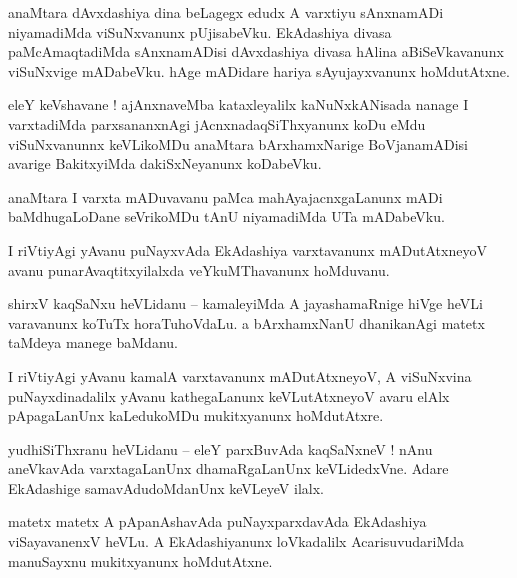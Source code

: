 \documentclass{article}
\begin{document}
\begin{mn}%
anaMtara dAvxdashiya dina beLagegx edudx A varxtiyu sAnxnamADi niyamadiMda viSuNxvanunx 
pUjisabeVku. EkAdashiya divasa paMcAmaqtadiMda sAnxnamADisi dAvxdashiya divasa hAlina 
aBiSeVkavanunx viSuNxvige mADabeVku. hAge mADidare hariya sAyujayxvanunx hoMdutAtxne.
\end{mn}

\begin{mn}%
eleY keVshavane ! ajAnxnaveMba kataxleyalilx kaNuNxkANisada nanage I varxtadiMda parxsananxnAgi 
jAcnxnadaqSiThxyanunx koDu eMdu viSuNxvanunnx keVLikoMDu anaMtara bArxhamxNarige BoVjanamADisi 
avarige BakitxyiMda dakiSxNeyanunx koDabeVku.
\end{mn}

\begin{mn}%
anaMtara I varxta mADuvavanu paMca mahAyajacnxgaLanunx mADi baMdhugaLoDane seVrikoMDu tAnU 
niyamadiMda UTa mADabeVku.
\end{mn}

\begin{mn}%
I riVtiyAgi yAvanu puNayxvAda EkAdashiya varxtavanunx mADutAtxneyoV avanu punarAvaqtitxyilalxda 
veYkuMThavanunx hoMduvanu.
\end{mn}

\begin{mn}%
shirxV kaqSaNxu heVLidanu -- kamaleyiMda A jayashamaRnige hiVge heVLi varavanunx koTuTx 
horaTuhoVdaLu. a bArxhamxNanU dhanikanAgi matetx taMdeya manege baMdanu.
\end{mn}

\begin{mn}%
I riVtiyAgi yAvanu kamalA varxtavanunx mADutAtxneyoV, A viSuNxvina puNayxdinadalilx yAvanu 
kathegaLanunx keVLutAtxneyoV avaru elAlx pApagaLanUnx kaLedukoMDu mukitxyanunx hoMdutAtxre.
\end{mn}


\begin{mn}%
yudhiSiThxranu heVLidanu -- eleY parxBuvAda kaqSaNxneV ! nAnu aneVkavAda varxtagaLanUnx 
dhamaRgaLanUnx keVLidedxVne. Adare EkAdashige samavAdudoMdanUnx keVLeyeV ilalx.
\end{mn}

\begin{mn}%
matetx matetx A pApanAshavAda puNayxparxdavAda EkAdashiya viSayavanenxV heVLu. A EkAdashiyanunx 
loVkadalilx AcarisuvudariMda manuSayxnu mukitxyanunx hoMdutAtxne.
\end{mn}
\end{document}

